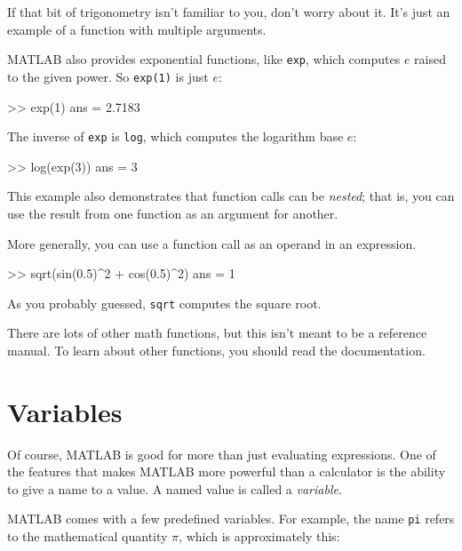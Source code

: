 If that bit of trigonometry isn't familiar to you, don't worry about
it.  It's just an example of a function with multiple arguments.


MATLAB also provides exponential functions, like \lstinline{exp}, which computes $e$ raised to the given power.  So \lstinline{exp(1)} is just $e$:

\begin{code}
>> exp(1)
ans = 2.7183
\end{code}


The inverse of \lstinline{exp} is \lstinline{log}, which computes the logarithm base $e$:

\begin{code}
>> log(exp(3))
ans = 3
\end{code}

This example also demonstrates that function calls can be \emph{nested};
that is, you can use the result from one function as an argument for
another.


More generally, you can use a function call as an operand in an \mbox{expression}.

\begin{code}
>> sqrt(sin(0.5)^2 + cos(0.5)^2)
ans = 1
\end{code}

As you probably guessed, \lstinline{sqrt} computes the square root.


There are lots of other math functions, but this isn't meant to
be a reference manual.  To learn about other functions, you should
read the documentation.


\section{Variables}

Of course, MATLAB is good for more than just evaluating expressions. One of the features that makes MATLAB more powerful than a calculator is the ability to give a name to a value.  A named value is called a \emph{variable}.


MATLAB comes with a few predefined variables. For
example, the name \lstinline{pi} refers to the
mathematical quantity $\pi$, which is approximately this:

